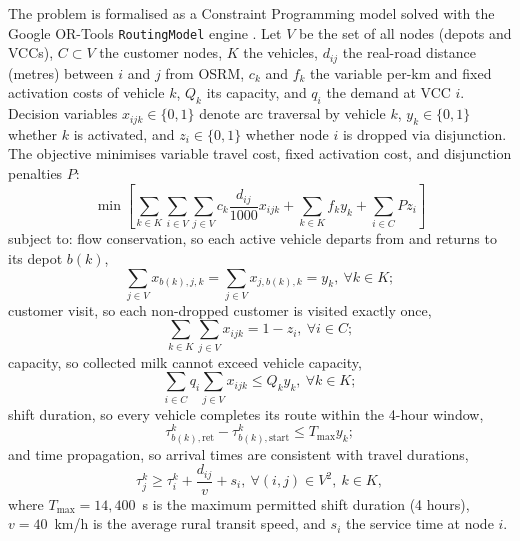\documentclass{svproc}
\begin{document}
The problem is formalised as a Constraint Programming model solved with the Google OR-Tools \texttt{RoutingModel} engine \cite{ORTools2024}. Let $V$ be the set of all nodes (depots and VCCs), $C\subset V$ the customer nodes, $K$ the vehicles, $d_{ij}$ the real-road distance (metres) between $i$ and $j$ from OSRM, $c_k$ and $f_k$ the variable per-km and fixed activation costs of vehicle $k$, $Q_k$ its capacity, and $q_i$ the demand at VCC $i$. Decision variables $x_{ijk}\in\{0,1\}$ denote arc traversal by vehicle $k$, $y_k\in\{0,1\}$ whether $k$ is activated, and $z_i\in\{0,1\}$ whether node $i$ is dropped via disjunction. The objective minimises variable travel cost, fixed activation cost, and disjunction penalties $P$:
\begin{equation}
\min\left[\sum_{k\in K}\sum_{i\in V}\sum_{j\in V} c_k\frac{d_{ij}}{1000}x_{ijk} + \sum_{k\in K} f_k y_k + \sum_{i\in C} P z_i\right]
\label{eq_obj}
\end{equation}
subject to: flow conservation, so each active vehicle departs from and returns to its depot $b(k)$,
\begin{equation}
\sum_{j\in V} x_{b(k),j,k} = \sum_{j\in V} x_{j,b(k),k} = y_k,\ \forall k\in K;
\label{eq_flow}
\end{equation}
customer visit, so each non-dropped customer is visited exactly once,
\begin{equation}
\sum_{k\in K}\sum_{j\in V} x_{ijk} = 1-z_i,\ \forall i\in C;
\label{eq_visit}
\end{equation}
capacity, so collected milk cannot exceed vehicle capacity,
\begin{equation}
\sum_{i\in C} q_i\sum_{j\in V} x_{ijk} \le Q_k y_k,\ \forall k\in K;
\label{eq_cap}
\end{equation}
shift duration, so every vehicle completes its route within the 4-hour window,
\begin{equation}
\tau^{k}_{b(k),\mathrm{ret}} - \tau^{k}_{b(k),\mathrm{start}} \le T_{\max}y_k;
\label{eq_time}
\end{equation}
and time propagation, so arrival times are consistent with travel durations,
\begin{equation}
\tau^{k}_{j} \ge \tau^{k}_{i} + \frac{d_{ij}}{v} + s_i,\ \forall(i,j)\in V^2,\ k\in K,
\label{eq_prop}
\end{equation}
where $T_{\max} = 14{,}400$~s is the maximum permitted shift duration (4 hours), $v=40$~km/h is the average rural transit speed, and $s_i$ the service time at node $i$.
\end{document}
